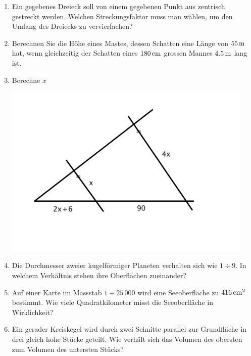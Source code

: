 \documentclass[%
11pt,%
twoside,%
titlepage,%
german,%
headsepline%
]{scrartcl}
\begin{document}
\begin{enumerate}
\item Ein gegebenes Dreieck soll von einem gegebenen Punkt aus zentrisch gestreckt werden. Welchen Streckungsfaktor muss man w\"ahlen, um den Umfang des Dreiecks zu vervierfachen?
\item Berechnen Sie die H\"ohe eines Mastes, dessen Schatten eine L\"ange von $\unit[55]{m}$ hat, wenn gleichzeitig der Schatten eines $\unit[180]{cm}$ grossen Mannes $\unit[4.5]{m}$ lang ist.
\item Berechne $x$
\begin{center}
\includegraphics[width=12cm]{pictures/seueb6}
\end{center}
\item Die Durchmesser zweier kugelf\"ormiger Planeten verhalten sich wie $1\div9$. In welchem Verh\"altnis stehen ihre Oberfl\"achen zueinander?
\item Auf einer Karte im Massstab $1\div25\,000$ wird eine Seeoberfl\"ache zu $\unit[416]{cm^2}$ bestimmt. Wie viele Quadratkilometer misst die Seeoberfl\"ache in Wirklichkeit?
\item Ein gerader Kreiskegel wird durch zwei Schnitte parallel zur Grundfl\"ache in drei gleich hohe St\"ucke geteilt. Wie verh\"alt sich das Volumen des obersten zum Volumen des untersten St\"ucks?

\end{enumerate}

\cleardoublepage

\appendix



\end{document}
